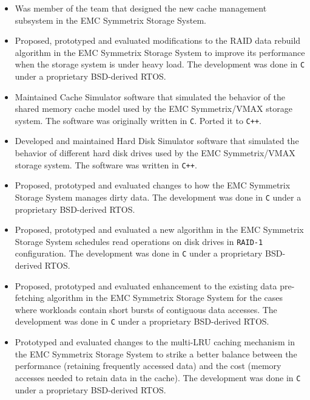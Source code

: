 {
	\begin{itemize}
		\item Was member of the team that designed the new cache management
			subsystem in the EMC Symmetrix Storage System.
		\item Proposed, prototyped and evaluated modifications to the RAID data rebuild algorithm
			in the EMC Symmetrix Storage System to improve its performance when
			the storage system is under heavy load. The
			development was done in \texttt{C} under a proprietary BSD-derived RTOS.
		\item Maintained Cache Simulator software that simulated the behavior of the 
			shared memory cache model used by the EMC Symmetrix/VMAX storage system.
			The software was originally written in \texttt{C}. Ported it to \texttt{C++}.
		\item Developed and maintained Hard Disk Simulator software that
			simulated the behavior of different hard disk drives used by the
			EMC Symmetrix/VMAX storage system. The software was written in \texttt{C++}.
	\end{itemize}
}
{
	\begin{itemize}
		\item Proposed, prototyped and evaluated changes to how the EMC Symmetrix Storage System manages dirty data.
			The development was done in \texttt{C} under a proprietary BSD-derived RTOS.
		\item Proposed, prototyped and evaluated a new algorithm in the EMC Symmetrix Storage System schedules read
			operations on disk drives in \texttt{RAID-1} configuration.
			The development was done in \texttt{C} under a proprietary BSD-derived RTOS.
		\item Proposed, prototyped and evaluated enhancement to the existing data pre-fetching algorithm
			in the EMC Symmetrix Storage System for the cases where workloads contain short bursts of 
			contiguous data accesses. The development was done in \texttt{C} under a proprietary BSD-derived RTOS.
		\item Prototyped and evaluated changes to the multi-LRU caching mechanism in the EMC Symmetrix Storage
			System to strike a better balance between the performance (retaining frequently accessed data) and the cost
			(memory accesses needed to retain data in the cache).
			The development was done in \texttt{C} under a proprietary BSD-derived RTOS.
	\end{itemize}
}
